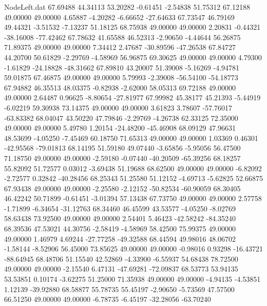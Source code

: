\begin{filecontents}{NodeLeft.dat}
  67.69488   44.34113   53.20282    -0.61451   -2.54838   51.75312   67.12188   49.00000   49.00000    4.65887   -4.20282   -6.66652  -27.64633
  67.73547   46.79169   49.44321    -3.51532   -7.13237   51.18125   68.75938   49.00000   49.00000    2.20831   -0.44321  -38.16008  -77.42462
  67.78632   41.65588   46.52313    -2.90650   -4.44644   56.26875   71.89375   49.00000   49.00000    7.34412    2.47687  -30.89596  -47.26538
  67.84727   44.20700   50.61829    -2.29769   -4.58969   56.96875   69.30625   49.00000   49.00000    4.79300   -1.61829  -24.18828  -48.31662
  67.89810   43.20007   51.39008    -5.16269   -4.94781   59.01875   67.46875   49.00000   49.00000    5.79993   -2.39008  -56.54100  -54.18773
  67.94882   46.35513   48.03375    -0.82938   -2.62000   58.05313   69.72188   49.00000   49.00000    2.64487    0.96625   -8.80654  -27.81977
  67.99982   45.38177   45.21393    -5.44919   -6.02219   59.30938   73.14375   49.00000   49.00000    3.61823    3.78607  -57.76017  -63.83382
  68.04047   43.50220   47.79846    -2.29769   -4.26738   62.33125   72.35000   49.00000   49.00000    5.49780    1.20154  -24.48200  -45.46908
  68.09129   47.96631   48.53699    -4.05250   -7.45469   60.18750   71.65313   49.00000   49.00000    1.03369    0.46301  -42.95568  -79.01813
  68.14195   51.59180   49.07440    -3.65856   -5.95056   56.47500   71.18750   49.00000   49.00000   -2.59180   -0.07440  -40.20509  -65.39256
  68.18257   55.82092   51.72577     0.03012   -3.69438   51.19688   68.62500   49.00000   49.00000   -6.82092   -2.72577    0.32842  -40.28456
  68.25343   51.25580   51.12152    -4.69713   -5.62825   52.66875   67.93438   49.00000   49.00000   -2.25580   -2.12152  -50.82534  -60.90059
  68.30405   46.42242   50.71899    -0.61451   -3.01394   57.13438   67.73750   49.00000   49.00000    2.57758   -1.71899   -6.34654  -31.12763
  68.34460   46.45599   43.53577    -4.05250   -8.02769   58.63438   73.92500   49.00000   49.00000    2.54401    5.46423  -42.58242  -84.35240
  68.39536   47.53021   44.30756    -2.58419   -4.58969   58.42500   75.99375   49.00000   49.00000    1.46979    4.69244  -27.77258  -49.32588
  68.44594   49.98016   48.06702    -1.58144   -8.52906   56.45000   73.85625   49.00000   49.00000   -0.98016    0.93298  -16.43721  -88.64945
  68.48706   51.15540   42.52869    -4.33900   -6.55937   54.68438   78.72500   49.00000   49.00000   -2.15540    6.47131  -47.69281  -72.09837
  68.53773   53.94135   53.53851     0.10174   -3.62275   51.25000   71.35938   49.00000   49.00000   -4.94135   -4.53851    1.12139  -39.92880
  68.58877   55.78735   55.45197    -2.90650   -5.73569   47.57500   66.51250   49.00000   49.00000   -6.78735   -6.45197  -32.28056  -63.70240

\end{filecontents}
